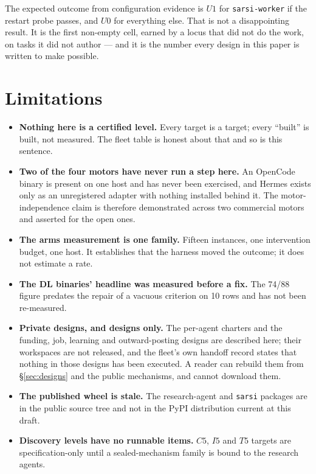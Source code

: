 The expected outcome from configuration evidence is $U1$ for \texttt{sarsi-worker} if the restart probe passes, and $U0$ for everything else. That is not a disappointing result. It is the first non-empty cell, earned by a locus that did not do the work, on tasks it did not author --- and it is the number every design in this paper is written to make possible.

\section{Limitations}\label{sec:limits}

\begin{itemize}[leftmargin=*]
\item \textbf{Nothing here is a certified level.} Every target is a target; every ``built'' is built, not measured. The fleet table is honest about that and so is this sentence.
\item \textbf{Two of the four motors have never run a step here.} An OpenCode binary is present on one host and has never been exercised, and Hermes exists only as an unregistered adapter with nothing installed behind it. The motor-independence claim is therefore demonstrated across two commercial motors and asserted for the open ones.
\item \textbf{The arms measurement is one family.} Fifteen instances, one intervention budget, one host. It establishes that the harness moved the outcome; it does not estimate a rate.
\item \textbf{The DL binaries' headline was measured before a fix.} The 74/88 figure predates the repair of a vacuous criterion on 10 rows and has not been re-measured.
\item \textbf{Private designs, and designs only.} The per-agent charters and the funding, job, learning and outward-posting designs are described here; their workspaces are not released, and the fleet's own handoff record states that nothing in those designs has been executed. A reader can rebuild them from \S\ref{sec:designs} and the public mechanisms, and cannot download them.
\item \textbf{The published wheel is stale.} The research-agent and \texttt{sarsi} packages are in the public source tree and not in the PyPI distribution current at this draft.
\item \textbf{Discovery levels have no runnable items.} $C5$, $I5$ and $T5$ targets are specification-only until a sealed-mechanism family is bound to the research agents.
\end{itemize}

